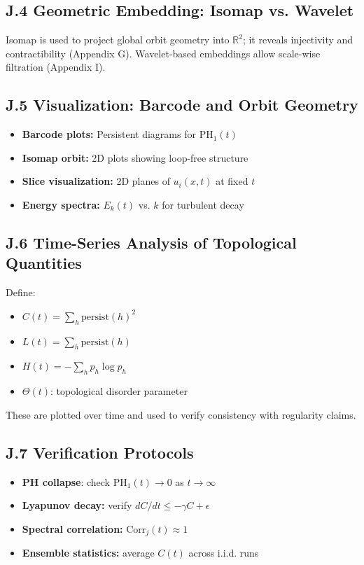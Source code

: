 \documentclass[11pt]{article}
\theoremstyle{definition}
\begin{document}
\subsection*{J.4 Geometric Embedding: Isomap vs. Wavelet}
Isomap is used to project global orbit geometry into $\mathbb{R}^2$; it reveals injectivity and contractibility (Appendix G). Wavelet-based embeddings allow scale-wise filtration (Appendix I).

\subsection*{J.5 Visualization: Barcode and Orbit Geometry}
\begin{itemize}
  \item \textbf{Barcode plots:} Persistent diagrams for $\mathrm{PH}_1(t)$
  \item \textbf{Isomap orbit:} 2D plots showing loop-free structure
  \item \textbf{Slice visualization:} 2D planes of $u_i(x,t)$ at fixed $t$
  \item \textbf{Energy spectra:} $E_k(t)$ vs. $k$ for turbulent decay
\end{itemize}

\subsection*{J.6 Time-Series Analysis of Topological Quantities}
Define:
\begin{itemize}
  \item $C(t) = \sum_h \mathrm{persist}(h)^2$
  \item $L(t) = \sum_h \mathrm{persist}(h)$
  \item $H(t) = -\sum_h p_h \log p_h$
  \item $\Theta(t)$: topological disorder parameter
\end{itemize}
These are plotted over time and used to verify consistency with regularity claims.

\subsection*{J.7 Verification Protocols}
\begin{itemize}
  \item \textbf{PH collapse}: check $\mathrm{PH}_1(t) \to 0$ as $t \to \infty$
  \item \textbf{Lyapunov decay:} verify $dC/dt \leq -\gamma C + \epsilon$
  \item \textbf{Spectral correlation:} $\mathrm{Corr}_j(t) \approx 1$
  \item \textbf{Ensemble statistics:} average $C(t)$ across i.i.d. runs
\end{itemize}
\end{document}
